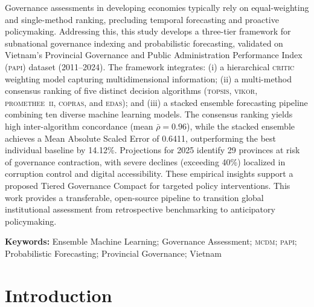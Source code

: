 \documentclass[12pt,a4paper]{article}
\begin{document}
\begin{titlepage}
  {\footnotesize
  \begin{justify}
  Governance assessments in developing economies typically rely on equal-weighting and single-method ranking, precluding temporal forecasting and proactive policymaking. Addressing this, this study develops a three-tier framework for subnational governance indexing and probabilistic forecasting, validated on Vietnam's Provincial Governance and Public Administration Performance Index (\textsc{papi}) dataset (2011--2024). The framework integrates: (i) a hierarchical \textsc{critic} weighting model capturing multidimensional information; (ii) a multi-method consensus ranking of five distinct decision algorithms (\textsc{topsis}, \textsc{vikor}, \textsc{promethee~ii}, \textsc{copras}, and \textsc{edas}); and (iii) a stacked ensemble forecasting pipeline combining ten diverse machine learning models. The consensus ranking yields high inter-algorithm concordance (mean $\bar{\rho} = 0.96$), while the stacked ensemble achieves a Mean Absolute Scaled Error of 0.6411, outperforming the best individual baseline by 14.12\%. Projections for 2025 identify 29 provinces at risk of governance contraction, with severe declines (exceeding 40\%) localized in corruption control and digital accessibility. These empirical insights support a proposed Tiered Governance Compact for targeted policy interventions. This work provides a transferable, open-source pipeline to transition global institutional assessment from retrospective benchmarking to anticipatory policymaking.
  \end{justify}
  }

  \vspace{0.5cm}

  \noindent\textbf{Keywords:} Ensemble Machine Learning; Governance Assessment; \textsc{mcdm}; \textsc{papi}; Probabilistic Forecasting; Provincial Governance; Vietnam

  \vspace{0.5cm}
\end{titlepage}

\clearpage
\tableofcontents
\clearpage

\section{Introduction}
\label{sec:introduction}

\end{document}
